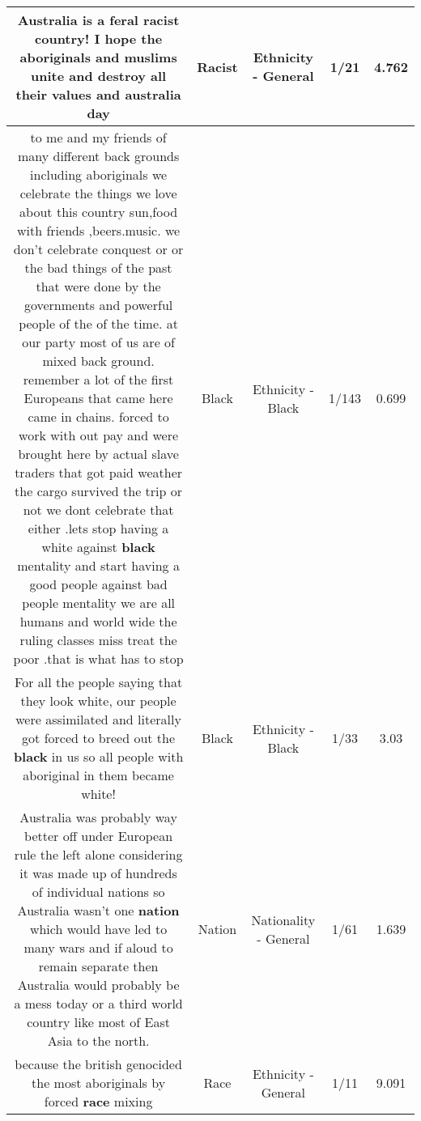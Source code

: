 \documentclass[11pt]{article}
\newlength\mylength
\begin{document}
\begin{center}
\begin{longtable}{|C{.65\mylength}|C{.30\mylength}|C{.12\mylength}|C{.12\mylength}|C{.12\mylength}|}
  \small Australia is a feral \textbf{racist} country! I hope the aboriginals and muslims unite and destroy all their values and australia day\normalsize   & Racist & Ethnicity - General & 1/21 & 4.762 \\  \hline
  \small to me and my friends of many different back grounds including aboriginals we celebrate the things we love about this country sun,food with friends ,beers.music. we don't celebrate conquest or or the bad things of the past that were done by the governments and powerful people of the of the time. at our party most of us are of mixed back ground. remember a lot of the first Europeans that came here came in chains. forced to work with out pay and  were brought here by actual slave traders that got paid weather the cargo survived the trip or not we dont celebrate that either .lets stop having a white against \textbf{black} mentality and start having a good people against bad people mentality we are all humans and world wide the ruling classes miss treat the poor .that is what has to stop\normalsize   & Black & Ethnicity - Black & 1/143 & 0.699 \\  \hline
  \small For all the people saying that they look white, our people were assimilated and literally got forced to breed out the \textbf{black} in us so all people with aboriginal in them became white!\normalsize   & Black & Ethnicity - Black & 1/33 & 3.03 \\  \hline
  \small Australia was probably way better off under European rule the left alone considering it was made up of hundreds of individual nations so Australia wasn't one \textbf{nation} which would have led to many wars and if aloud to remain separate then Australia would probably be a mess today or a third world country like most of East Asia to the north.\normalsize   & Nation & Nationality - General & 1/61 & 1.639 \\  \hline
  \small because the british genocided the most aboriginals by forced \textbf{race} mixing\normalsize   & Race & Ethnicity - General & 1/11 & 9.091 \\  \hline

\end{longtable}
\end{center}
\end{document}
